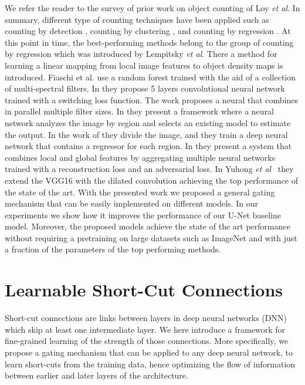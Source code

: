 \documentclass{bmvc2k}
\def\etal{\emph{et al}\bmvaOneDot}
\begin{document}
We refer the reader to the survey of prior work on object counting of Loy \etal\cite{loy2013}. In summary, different type of counting techniques have been applied such as counting by detection \cite{dalal2005,felzenszwalb2010,chen2015,leibe2005,li2008,patzold2010,viola2004,wang2011}, counting by clustering \cite{babaud2006,tu2008}, and counting by regression \cite{arteta2014,chan2008,fiaschi2012,lempitsky2010,zhang_2015_CVPR,rodriguez2011,pham2015}. At this point in time, the best-performing methods belong to the group of counting by regression which was introduced by Lempitsky \etal\cite{lempitsky2010}. There a method for learning a linear mapping from local image features to object density maps is introduced. Fiaschi et al. \cite{fiaschi2012} use a random forest trained with the aid of a collection of multi-spectral filters. In \cite{zhang_2015_CVPR} they propose 5 layers convolutional neural network trained with a switching loss function. The work \cite{zhang2016} proposes a neural that combines in parallel multiple filter sizes. In \cite{Sam_2017_CVPR} they present a framework where a neural network analyzes the image by region and selects an existing model to estimate the output. In the work of \cite{Zhang_2017_CVPR} they divide the image, and they train a deep neural network that contains a regressor for each region.  In \cite{Sindagi_2017_ICCV} they present a system that combines local and global features by aggregating multiple neural networks trained with a reconstruction loss and an adversarial loss. In Yuhong \etal~\cite{yuhong2018_csrnet} they extend the VGG16 with the dilated convolution \citep{YuKoltun2016} achieving the top performance of the state of the art. With the presented work we proposed a general gating mechanism that can be easily implemented on different models. In our experiments we show how it improves the performance of our U-Net baseline model. Moreover, the proposed models achieve the state of the art performance without requiring a pretraining on large datasets such as ImageNet and with just a fraction of the parameters of the top performing methods.


\section{Learnable Short-Cut Connections}\label{sec:gating_units}

Short-cut connections are links between layers in deep neural networks (DNN) which skip at least one intermediate layer. We here introduce a framework for fine-grained learning of the strength of those connections. More specifically, we propose a gating mechanism that can be applied to any deep neural network, to learn short-cuts from the training data, hence optimizing the flow of information between earlier and later layers of the architecture. 
\end{document}
